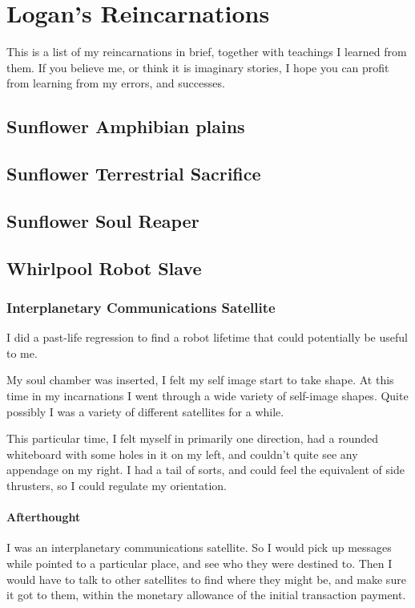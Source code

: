 \part{Logan's Reincarnations}\label{reincarnation}

This is a list of my reincarnations in brief, together with teachings I learned
from them. 
If you believe me, or think it is imaginary stories, 
I hope you can profit from learning from my errors, and successes.

\chapter{Sunflower Amphibian plains}
\chapter{Sunflower Terrestrial Sacrifice}
\chapter{Sunflower Soul Reaper}
\chapter{Whirlpool Robot Slave}
\section{Interplanetary Communications Satellite}\label{comsatlife}
I did a past-life regression to find a robot lifetime that could potentially be
useful to me. 

My soul chamber was inserted, I felt my self image start to take shape. 
At this time in my incarnations I went through a wide variety of self-image
shapes. 
Quite possibly I was a variety of different satellites for a while.  

This particular time,  I felt myself in primarily one direction, 
had a rounded whiteboard with some holes in it on my left, and couldn't quite
see any appendage on my right. 
I had a tail of sorts, and could feel the equivalent of side thrusters, so I
could regulate my orientation.  


\subsection{Afterthought}
I was an interplanetary communications satellite. So I would pick up messages
while pointed to a particular place,  and see who they were destined to. Then I
would have to talk to other satellites to find where they might be,  and
make sure it got to them, within the monetary allowance of the initial
transaction payment.  

